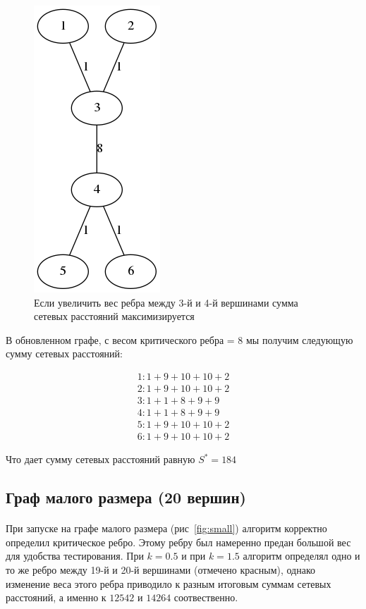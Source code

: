 \documentclass[12pt]{article}
\begin{document}
\begin{figure}[h]
    \centering
    \includegraphics[scale=0.7]{min_graph_8.png}
    \caption{Если увеличить вес ребра между 3-й и 4-й вершинами сумма сетевых расстояний максимизируется}
    \label{fig:min_graph_8}
\end{figure}

В обновленном графе, с весом критического ребра = 8 мы получим следующую
сумму сетевых расстояний:

\begin{gather}
1 : 1 + 9 + 10 + 10 + 2 \\
2 : 1 + 9 + 10 + 10 + 2 \\
3 : 1 + 1 + 8  + 9  + 9 \\
4 : 1 + 1 + 8  + 9  + 9 \\
5 : 1 + 9 + 10 + 10 + 2 \\
6 : 1 + 9 + 10 + 10 + 2
\end{gather}

Что дает сумму сетевых расстояний равную $S^* = 184$

\subsection{Граф малого размера (20 вершин)}

\paragraph{}
При запуске на графе малого размера (рис~\ref{fig:small}) 
алгоритм корректно определил критическое ребро.
Этому ребру был намеренно предан большой вес для удобства тестирования.
При $k = 0.5$ и при $k = 1.5$ алгоритм определял одно
и то же ребро между 19-й и 20-й вершинами (отмечено красным),
однако изменение веса этого ребра приводило к разным итоговым
суммам сетевых расстояний, а именно к $12542$ и $14264$ соотвественно.
\end{document}
